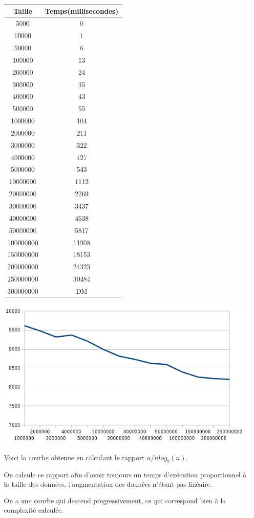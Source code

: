 \documentclass[a4paper, 12pt]{article}
\begin{document}
\begin{minipage}[c]{0.4\linewidth}
\begin{tabular}{|c|c|}
\hline
Taille & Temps(millisecondes) \\
\hline
5000&	0\\
10000&	1\\
50000&	6\\
100000&	13\\
200000&	24\\
300000&	35\\
400000&	43\\
500000&	55\\
1000000&	104\\
2000000	& 211\\
3000000&	322\\
4000000	& 427\\
5000000	& 543\\
10000000&	1112\\
20000000&	2269\\
30000000&	3437\\
40000000&	4638\\
50000000&	5817\\
100000000&	11908\\
150000000&	18153\\
200000000&	24323\\
250000000&	30484\\
300000000 &  DM \\
\hline
\end{tabular}
\end{minipage}\hfill
\begin{minipage}[c]{0.5\linewidth}
	\includegraphics[scale=0.6]{curve_algo_3.png}
	
	
    Voici la courbe obtenue en calculant le rapport $n/n log _2(n)$.
    	 
    On calcule ce rapport afin d'avoir toujours un temps d’exécution proportionnel à la taille des données, l'augmentation des données n'étant pas linéaire.
        
    On a une courbe qui descend progressivement, ce qui correspond bien à la complexité calculée.
\end{minipage}\hfill
\end{document}
